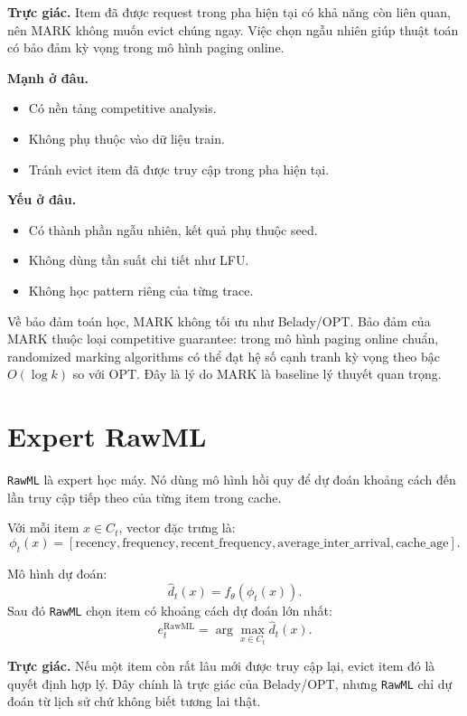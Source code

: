\documentclass[11pt,a4paper]{article}
\newcommand{\code}[1]{\texttt{#1}}
\newcommand{\rawml}{\code{RawML}}
\begin{document}
\textbf{Trực giác.} Item đã được request trong pha hiện tại có khả năng còn liên quan, nên MARK không muốn evict chúng ngay. Việc chọn ngẫu nhiên giúp thuật toán có bảo đảm kỳ vọng trong mô hình paging online.

\textbf{Mạnh ở đâu.}
\begin{itemize}[leftmargin=1.4em]
    \item Có nền tảng competitive analysis.
    \item Không phụ thuộc vào dữ liệu train.
    \item Tránh evict item đã được truy cập trong pha hiện tại.
\end{itemize}

\textbf{Yếu ở đâu.}
\begin{itemize}[leftmargin=1.4em]
    \item Có thành phần ngẫu nhiên, kết quả phụ thuộc seed.
    \item Không dùng tần suất chi tiết như LFU.
    \item Không học pattern riêng của từng trace.
\end{itemize}

Về bảo đảm toán học, MARK không tối ưu như Belady/OPT. Bảo đảm của MARK thuộc loại competitive guarantee: trong mô hình paging online chuẩn, randomized marking algorithms có thể đạt hệ số cạnh tranh kỳ vọng theo bậc \(O(\log k)\) so với OPT. Đây là lý do MARK là baseline lý thuyết quan trọng.

\section{Expert RawML}

\rawml{} là expert học máy. Nó dùng mô hình hồi quy để dự đoán khoảng cách đến lần truy cập tiếp theo của từng item trong cache.

Với mỗi item \(x\in C_t\), vector đặc trưng là:
\[
    \phi_t(x)=
    [
    \text{recency},
    \text{frequency},
    \text{recent\_frequency},
    \text{average\_inter\_arrival},
    \text{cache\_age}
    ].
\]

Mô hình dự đoán:
\[
    \widehat{d}_t(x)=f_\theta(\phi_t(x)).
\]
Sau đó \rawml{} chọn item có khoảng cách dự đoán lớn nhất:
\[
    e_t^{\mathrm{RawML}}
    =
    \arg\max_{x\in C_t}\widehat{d}_t(x).
\]

\textbf{Trực giác.} Nếu một item còn rất lâu mới được truy cập lại, evict item đó là quyết định hợp lý. Đây chính là trực giác của Belady/OPT, nhưng \rawml{} chỉ dự đoán từ lịch sử chứ không biết tương lai thật.
\end{document}
